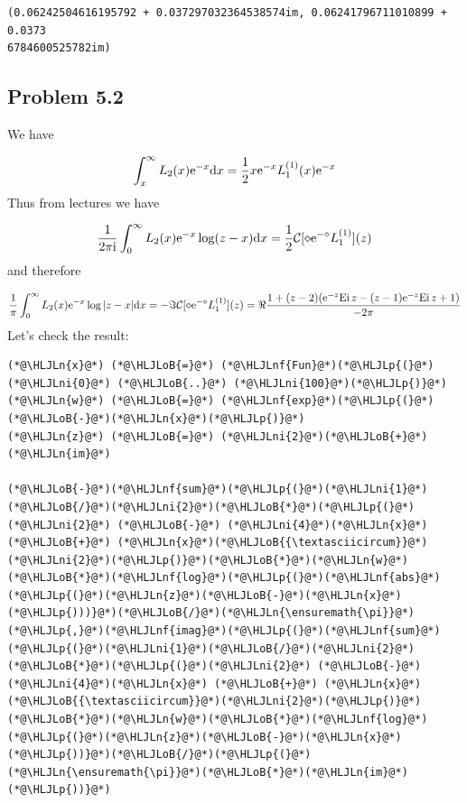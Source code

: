 \documentclass[12pt,a4paper]{article}
\newcommand{\HLJLn}[1]{#1}
\newcommand{\HLJLnf}[1]{\textcolor[RGB]{66,102,213}{#1}}
\newcommand{\HLJLni}[1]{\textcolor[RGB]{59,151,46}{#1}}
\newcommand{\HLJLoB}[1]{\textcolor[RGB]{102,102,102}{\textbf{#1}}}
\newcommand{\HLJLp}[1]{#1}
\def\D{ {\rm d} }
\def\I{ {\rm i} }
\def\E{ {\rm e} }
\def\CC{ {\cal C} }
\def\Ei{ {\rm Ei}\, }
\def\dx{\D x}
\begin{document}
\begin{lstlisting}
(0.06242504616195792 + 0.037297032364538574im, 0.06241796711010899 + 0.0373
6784600525782im)
\end{lstlisting}


\subsection{Problem 5.2}
We have 

\[
\int_x^\infty L_2(x) \E^{-x} \dx = {1 \over 2} x \E^{-x} L_1^{(1)}(x) \E^{-x}
\]
Thus from lectures we have

\[
{1 \over 2 \pi\I} \int_0^\infty L_2(x) \E^{-x} \log(z-x) \dx = {1 \over 2}\CC[ \diamond \E^{-\diamond} L_1^{(1)}](z)
\]
and therefore

\[
{1 \over \pi} \int_0^\infty L_2(x) \E^{-x} \log|z-x| \dx  = -\Im \CC[ \diamond \E^{-\diamond} L_1^{(1)}](z) = \Re{1  + (z-2) (\E^{-z} \Ei z - (z-1) \E^{-z} \Ei z +1) \over -2 \pi }
\]
Let's check the result:


\begin{lstlisting}
(*@\HLJLn{x}@*) (*@\HLJLoB{=}@*) (*@\HLJLnf{Fun}@*)(*@\HLJLp{(}@*)(*@\HLJLni{0}@*) (*@\HLJLoB{..}@*) (*@\HLJLni{100}@*)(*@\HLJLp{)}@*)
(*@\HLJLn{w}@*) (*@\HLJLoB{=}@*) (*@\HLJLnf{exp}@*)(*@\HLJLp{(}@*)(*@\HLJLoB{-}@*)(*@\HLJLn{x}@*)(*@\HLJLp{)}@*)
(*@\HLJLn{z}@*) (*@\HLJLoB{=}@*) (*@\HLJLni{2}@*)(*@\HLJLoB{+}@*)(*@\HLJLn{im}@*)

(*@\HLJLoB{-}@*)(*@\HLJLnf{sum}@*)(*@\HLJLp{(}@*)(*@\HLJLni{1}@*)(*@\HLJLoB{/}@*)(*@\HLJLni{2}@*)(*@\HLJLoB{*}@*)(*@\HLJLp{(}@*)(*@\HLJLni{2}@*) (*@\HLJLoB{-}@*) (*@\HLJLni{4}@*)(*@\HLJLn{x}@*) (*@\HLJLoB{+}@*) (*@\HLJLn{x}@*)(*@\HLJLoB{{\textasciicircum}}@*)(*@\HLJLni{2}@*)(*@\HLJLp{)}@*)(*@\HLJLoB{*}@*)(*@\HLJLn{w}@*)(*@\HLJLoB{*}@*)(*@\HLJLnf{log}@*)(*@\HLJLp{(}@*)(*@\HLJLnf{abs}@*)(*@\HLJLp{(}@*)(*@\HLJLn{z}@*)(*@\HLJLoB{-}@*)(*@\HLJLn{x}@*)(*@\HLJLp{)))}@*)(*@\HLJLoB{/}@*)(*@\HLJLn{\ensuremath{\pi}}@*)(*@\HLJLp{,}@*)(*@\HLJLnf{imag}@*)(*@\HLJLp{(}@*)(*@\HLJLnf{sum}@*)(*@\HLJLp{(}@*)(*@\HLJLni{1}@*)(*@\HLJLoB{/}@*)(*@\HLJLni{2}@*)(*@\HLJLoB{*}@*)(*@\HLJLp{(}@*)(*@\HLJLni{2}@*) (*@\HLJLoB{-}@*) (*@\HLJLni{4}@*)(*@\HLJLn{x}@*) (*@\HLJLoB{+}@*) (*@\HLJLn{x}@*)(*@\HLJLoB{{\textasciicircum}}@*)(*@\HLJLni{2}@*)(*@\HLJLp{)}@*)(*@\HLJLoB{*}@*)(*@\HLJLn{w}@*)(*@\HLJLoB{*}@*)(*@\HLJLnf{log}@*)(*@\HLJLp{(}@*)(*@\HLJLn{z}@*)(*@\HLJLoB{-}@*)(*@\HLJLn{x}@*)(*@\HLJLp{))}@*)(*@\HLJLoB{/}@*)(*@\HLJLp{(}@*)(*@\HLJLn{\ensuremath{\pi}}@*)(*@\HLJLoB{*}@*)(*@\HLJLn{im}@*)(*@\HLJLp{))}@*)
\end{lstlisting}
\end{document}
